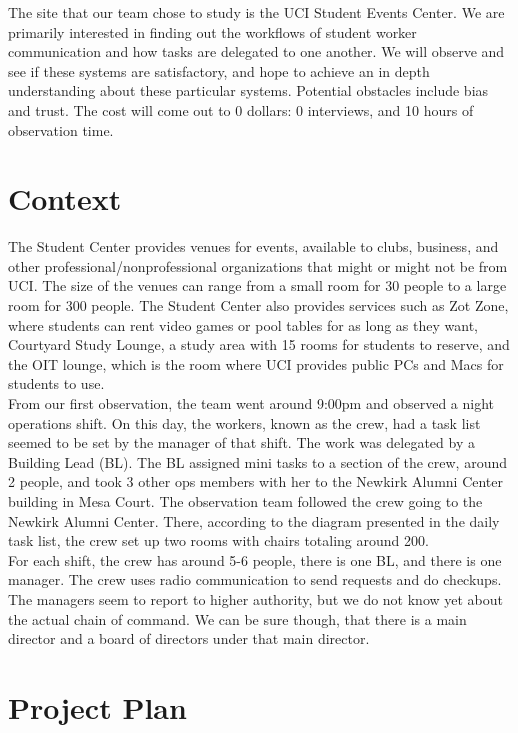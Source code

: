\documentclass[letterpaper, 12pt]{report}
\begin{document}
The site that our team chose to study is the UCI Student Events Center. We are primarily interested in finding out the workflows of student worker communication and how tasks are delegated to one another. We will observe and see if these systems are satisfactory, and hope to achieve an in depth understanding about these particular systems. Potential obstacles include bias and trust. The cost will come out to 0 dollars: 0 interviews, and 10 hours of observation time.

\section{Context}

The Student Center provides venues for events, available to clubs, business, and other professional/nonprofessional organizations that might or might not be from UCI. The size of the venues can range from a small room for 30 people to a large room for 300 people. The Student Center also provides services such as Zot Zone, where students can rent video games or pool tables for as long as they want, Courtyard Study Lounge, a study area with 15 rooms for students to reserve, and the OIT lounge, which is the room where UCI provides public PCs and Macs for students to use.\\

From our first observation, the team went around 9:00pm and observed a night operations shift. On this day, the workers, known as the crew, had a task list seemed to be set by the manager of that shift. The work was delegated by a Building Lead (BL). The BL assigned mini tasks to a section of the crew, around 2 people, and took 3 other ops members with her to the Newkirk Alumni Center building in Mesa Court. The observation team followed the crew going to the Newkirk Alumni Center. There, according to the diagram presented in the daily task list, the crew set up two rooms with chairs totaling around 200.\\

For each shift, the crew has around 5-6 people, there is one BL, and there is one manager. The crew uses radio communication to send requests and do checkups. The managers  seem to report to higher authority, but we do not know yet about the actual chain of command. We can be sure though, that there is a main director and a board of directors under that main director.

\section{Project Plan}
\end{document}
